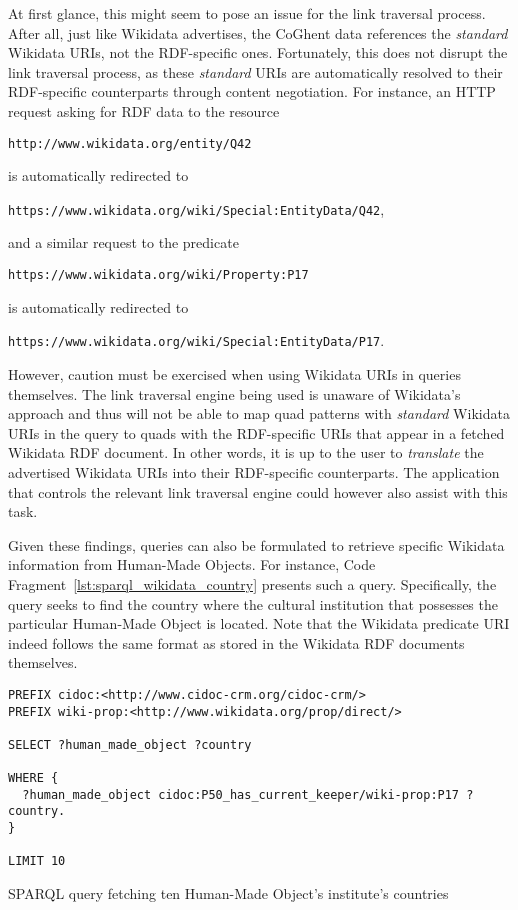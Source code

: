 At first glance, this might seem to pose an issue for the link traversal process. After all, just like Wikidata advertises, the CoGhent data references the \textit{standard} Wikidata URIs, not the RDF-specific ones. Fortunately, this does not disrupt the link traversal process, as these \textit{standard} URIs are automatically resolved to their RDF-specific counterparts through content negotiation. For instance, an HTTP request asking for RDF data to the resource 
\begin{center}
    \texttt{http://www.wikidata.org/entity/Q42}
\end{center}
is automatically redirected to
\begin{center}
    \texttt{https://www.wikidata.org/wiki/Special:EntityData/Q42},
\end{center}
and a similar request to the predicate
\begin{center}
    \texttt{https://www.wikidata.org/wiki/Property:P17}
\end{center}
is automatically redirected to
\begin{center}
    \texttt{https://www.wikidata.org/wiki/Special:EntityData/P17}.
\end{center}

However, caution must be exercised when using Wikidata URIs in queries themselves. The link traversal engine being used is unaware of Wikidata's approach and thus will not be able to map quad patterns with \textit{standard} Wikidata URIs in the query to quads with the RDF-specific URIs that appear in a fetched Wikidata RDF document. In other words, it is up to the user to \textit{translate} the advertised Wikidata URIs into their RDF-specific counterparts. The application that controls the relevant link traversal engine could however also assist with this task.

Given these findings, queries can also be formulated to retrieve specific Wikidata information from Human-Made Objects. For instance, Code Fragment~\ref{lst:sparql_wikidata_country} presents such a query. Specifically, the query seeks to find the country where the cultural institution that possesses the particular Human-Made Object is located. Note that the Wikidata predicate URI indeed follows the same format as stored in the Wikidata RDF documents themselves.

\begin{listing}[htbp]
    \begin{verbatim}
PREFIX cidoc:<http://www.cidoc-crm.org/cidoc-crm/>
PREFIX wiki-prop:<http://www.wikidata.org/prop/direct/>

SELECT ?human_made_object ?country

WHERE {
  ?human_made_object cidoc:P50_has_current_keeper/wiki-prop:P17 ?country.
}

LIMIT 10
    \end{verbatim}
    \caption{SPARQL query fetching ten Human-Made Object's institute's countries}
    \label{lst:sparql_wikidata_country}
\end{listing}

